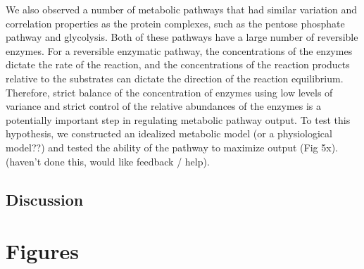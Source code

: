 \documentclass[11pt,]{article}
\begin{document}
We also observed a number of metabolic pathways that had similar
variation and correlation properties as the protein complexes, such as
the pentose phosphate pathway and glycolysis. Both of these pathways
have a large number of reversible enzymes. For a reversible enzymatic
pathway, the concentrations of the enzymes dictate the rate of the
reaction, and the concentrations of the reaction products relative to
the substrates can dictate the direction of the reaction equilibrium.
Therefore, strict balance of the concentration of enzymes using low
levels of variance and strict control of the relative abundances of the
enzymes is a potentially important step in regulating metabolic pathway
output. To test this hypothesis, we constructed an idealized metabolic
model (or a physiological model??) and tested the ability of the pathway
to maximize output (Fig 5x). (haven't done this, would like feedback /
help).

\hypertarget{discussion}{%
\subsection{Discussion}\label{discussion}}

\newpage

\hypertarget{figures}{%
\section{Figures}\label{figures}}
\end{document}
